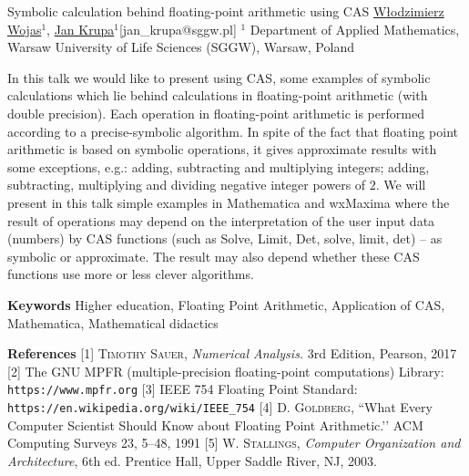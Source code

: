 


\begin{abstract_online}{Symbolic calculation behind floating-point arithmetic using CAS}{%
        \underline{W{\l}odzimierz Wojas}$^{1}$, \underline{Jan Krupa}$^{1}$}{[jan\_krupa@sggw.pl]
        }{%
        $^1$ Department of Applied Mathematics, Warsaw University of Life Sciences (SGGW), Warsaw, Poland}




In this talk we would like to present using CAS, some examples of symbolic calculations which lie behind calculations in floating-point arithmetic (with double precision). Each operation in floating-point arithmetic is performed according to a precise-symbolic algorithm. In spite of the fact that floating point arithmetic is based on symbolic operations, it gives approximate results with some  exceptions, e.g.:  adding, subtracting and multiplying integers;  adding, subtracting, multiplying and dividing negative integer powers of\; $2$.
We will present in this talk simple examples in Mathematica and wxMaxima where the result of operations may depend on the interpretation of the user input data (numbers) by CAS functions (such as Solve, Limit, Det, solve, limit, det) – as symbolic or approximate. The result may also depend whether  these CAS functions use more  or less clever algorithms.


\textbf{Keywords} \newline{} Higher education, Floating Point Arithmetic, Application of CAS, Mathematica, Mathematical didactics




\textbf{References}\newline{}
[1] \textsc{Timothy Sauer},  \emph{Numerical Analysis.} 3rd Edition, Pearson,  2017 \newline{}
[2] The GNU MPFR (multiple-precision floating-point computations) Library: \break  \texttt{https://www.mpfr.org} \newline{}
[3] IEEE 754 Floating Point Standard:  \newline{} \texttt{https://en.wikipedia.org/wiki/IEEE\_754} \newline{}
[4] \textsc{D. Goldberg},  “What Every Computer Scientist Should Know about Floating Point
Arithmetic.’’ ACM Computing Surveys 23, 5–48, 1991 \newline{}
[5] \textsc{W. Stallings}, \emph{Computer Organization and Architecture}, 6th ed. Prentice Hall, Upper Saddle River, NJ, 2003.
\end{abstract_online}
